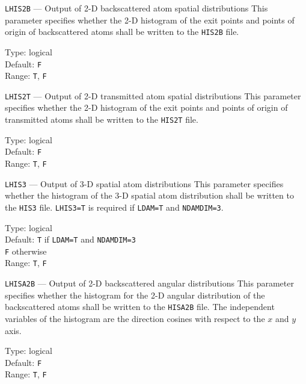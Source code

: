 \begin{keydescription}{\texttt{LHIS2B} --- Output of 2-D backscattered atom spatial distributions}
%
  This parameter specifies whether the 2-D histogram of the exit points
  and points of origin of backscattered atoms shall be written to
  the \texttt{HIS2B} file.
  \begin{keytab}
    Type:    \> logical \\
    Default: \> \texttt{F} \\
    Range:   \> \texttt{T}, \texttt{F} 
  \end{keytab}
\end{keydescription}

\begin{keydescription}{\texttt{LHIS2T} --- Output of 2-D transmitted atom spatial distributions}
%
  This parameter specifies whether the 2-D histogram of the exit points
  and points of origin of transmitted atoms shall be written to
  the \texttt{HIS2T} file.
  \begin{keytab}
    Type:    \> logical \\
    Default: \> \texttt{F} \\
    Range:   \> \texttt{T}, \texttt{F} 
  \end{keytab}
\end{keydescription}

\begin{keydescription}{\texttt{LHIS3} --- Output of 3-D spatial atom distributions}
%
  This parameter specifies whether the histogram of the 3-D spatial atom
  distribution shall be written to the \texttt{HIS3} file. \texttt{LHIS3=T} is
  required if \texttt{LDAM=T} and \texttt{NDAMDIM=3}.
  \begin{keytab}
    Type:    \> logical \\
    Default: \> \texttt{T} if \texttt{LDAM=T} and \texttt{NDAMDIM=3} \\
             \> \texttt{F} otherwise \\
    Range:   \> \texttt{T}, \texttt{F} 
  \end{keytab}
\end{keydescription}

\begin{keydescription}{\texttt{LHISA2B} --- Output of 2-D backscattered angular distributions}
%
  This parameter specifies whether the histogram for the 2-D angular
  distribution of the backscattered atoms shall be written to the
  \texttt{HISA2B} file. The independent variables of the histogram are the
  direction cosines with respect to the $x$ and $y$ axis.
  \begin{keytab}
    Type:    \> logical \\
    Default: \> \texttt{F} \\
    Range:   \> \texttt{T}, \texttt{F} 
  \end{keytab}
\end{keydescription}


